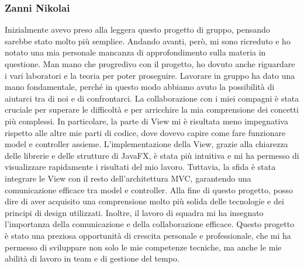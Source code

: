 \documentclass[a4paper,12pt]{report}
\begin{document}
\subsubsection{Zanni Nikolai}
Inizialmente avevo preso alla leggera questo progetto di gruppo, pensando sarebbe stato molto più semplice. Andando avanti, però, mi sono ricreduto e ho notato una mia personale mancanza di approfondimento sulla materia in questione. Man mano che progredivo con il progetto, ho dovuto anche riguardare i vari laboratori e la teoria per poter proseguire.
Lavorare in gruppo ha dato una mano fondamentale, perché in questo modo abbiamo avuto la possibilità di aiutarci tra di noi e di confrontarci. La collaborazione con i miei compagni è stata cruciale per superare le difficoltà e per arricchire la mia comprensione dei concetti più complessi.
In particolare, la parte di View mi è risultata meno impegnativa rispetto alle altre mie parti di codice, dove dovevo capire come fare funzionare model e controller assieme. L'implementazione della View, grazie alla chiarezza delle librerie e delle strutture di JavaFX, è stata più intuitiva e mi ha permesso di visualizzare rapidamente i risultati del mio lavoro. Tuttavia, la sfida è stata integrare le View con il resto dell'architettura MVC, garantendo una comunicazione efficace tra model e controller.
Alla fine di questo progetto, posso dire di aver acquisito una comprensione molto più solida delle tecnologie e dei principi di design utilizzati. Inoltre, il lavoro di squadra mi ha insegnato l'importanza della comunicazione e della collaborazione efficace. Questo progetto è stato una preziosa opportunità di crescita personale e professionale, che mi ha permesso di sviluppare non solo le mie competenze tecniche, ma anche le mie abilità di lavoro in team e di gestione del tempo.
\end{document}

